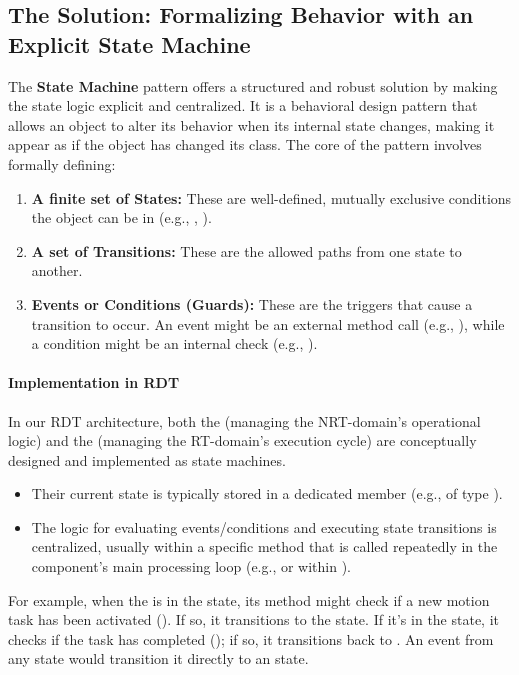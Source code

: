 \subsection{The Solution: Formalizing Behavior with an Explicit State Machine}
\label{subsec:state_machine_solution_conceptual_revised}

The \textbf{State Machine} pattern offers a structured and robust solution by making the state logic explicit and centralized. It is a behavioral design pattern that allows an object to alter its behavior when its internal state changes, making it appear as if the object has changed its class. The core of the pattern involves formally defining:
\begin{enumerate}
    \item \textbf{A finite set of States:} These are well-defined, mutually exclusive conditions the object can be in (e.g., , ).
    \item \textbf{A set of Transitions:} These are the allowed paths from one state to another.
    \item \textbf{Events or Conditions (Guards):} These are the triggers that cause a transition to occur. An event might be an external method call (e.g., ), while a condition might be an internal check (e.g., ).
\end{enumerate}

\paragraph{Implementation in RDT}
In our RDT architecture, both the  (managing the NRT-domain's operational logic) and the  (managing the RT-domain's execution cycle) are conceptually designed and implemented as state machines.
\begin{itemize}
    \item Their current state is typically stored in a dedicated  member (e.g.,  of type ).
    \item The logic for evaluating events/conditions and executing state transitions is centralized, usually within a specific method that is called repeatedly in the component's main processing loop (e.g.,  or within ).
\end{itemize}
For example, when the  is in the  state, its  method might check if a new motion task has been activated (). If so, it transitions to the  state. If it's in the  state, it checks if the task has completed (); if so, it transitions back to . An  event from any state would transition it directly to an  state.

